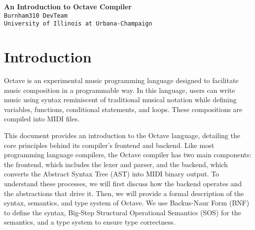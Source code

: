 \documentclass[letterpaper,12pt]{article}
\begin{document}
\sectionfont{\color{MyBlue}} %
\subsectionfont{\color{MyBlue}} %


\begin{tcolorbox}[
    fonttitle=\sffamily\bfseries,
    colback=MyBlue!20, %
    colframe=MyBlue!80, %
    coltitle=white, %
    coltext=black, %
    colbacktitle=MyBlue!80, %
    sharp corners, %
    boxrule=1mm, %
    width=\textwidth, %
    leftrule=2mm, %
    titlerule=0mm, %
    bottomrule=0mm, %
    arc=5mm, %
    boxsep=5mm, %
    before=\vskip10pt, %
    after=\vskip10pt %
]

\begin{center}
    \textbf{\Large An Introduction to Octave Compiler} \\
    \vspace{5pt}
    \texttt{Burnham310 DevTeam} \\
    \vspace{5pt}
    \texttt{University of Illinois at Urbana-Champaign}
\end{center}

\end{tcolorbox}
\section{Introduction}

Octave is an experimental music programming language designed to facilitate music composition in a programmable way. In this language, users can write music using syntax reminiscent of traditional musical notation while defining variables, functions, conditional statements, and loops. These compositions are compiled into MIDI files.

This document provides an introduction to the Octave language, detailing the core principles 
behind its compiler's frontend and backend. 
Like most programming language compilers, the Octave compiler has two main components: the frontend, 
which includes the lexer and parser, and the backend, 
which converts the Abstract Syntax Tree (AST) into MIDI binary output. 
To understand these processes, we will first discuss how the backend 
operates and the abstractions that drive it.
Then, we will provide a formal description of the syntax, semantics, and type system of Octave. We use Backus-Naur Form (BNF) to define the syntax, Big-Step Structural Operational Semantics (SOS) for the semantics, and a type system to ensure type correctness.
\end{document}
